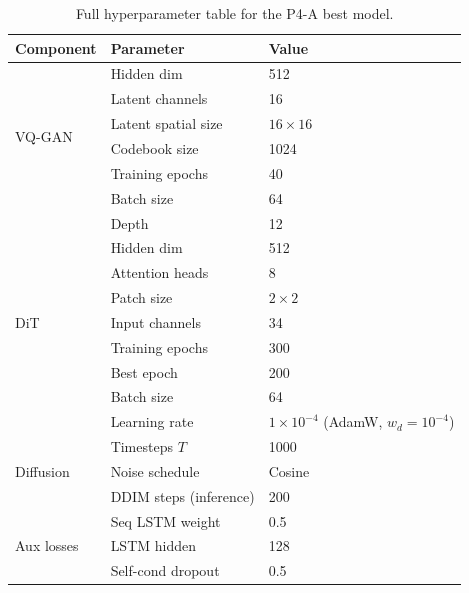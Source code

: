 \documentclass[11pt,a4paper]{article}
\begin{document}
\begin{table}[h]
\centering
\caption{Full hyperparameter table for the P4-A best model.}
\begin{tabular}{lll}
\toprule
\textbf{Component} & \textbf{Parameter} & \textbf{Value} \\
\midrule
\multirow{6}{*}{VQ-GAN}
 & Hidden dim & 512 \\
 & Latent channels & 16 \\
 & Latent spatial size & $16\times16$ \\
 & Codebook size & 1024 \\
 & Training epochs & 40 \\
 & Batch size & 64 \\
\midrule
\multirow{9}{*}{DiT}
 & Depth & 12 \\
 & Hidden dim & 512 \\
 & Attention heads & 8 \\
 & Patch size & $2\times2$ \\
 & Input channels & 34 \\
 & Training epochs & 300 \\
 & Best epoch & 200 \\
 & Batch size & 64 \\
 & Learning rate & $1\times10^{-4}$ (AdamW, $w_d=10^{-4}$) \\
\midrule
\multirow{3}{*}{Diffusion}
 & Timesteps $T$ & 1000 \\
 & Noise schedule & Cosine \\
 & DDIM steps (inference) & 200 \\
\midrule
\multirow{3}{*}{Aux losses}
 & Seq LSTM weight & 0.5 \\
 & LSTM hidden & 128 \\
 & Self-cond dropout & 0.5 \\
\bottomrule
\end{tabular}
\end{table}
\end{document}
